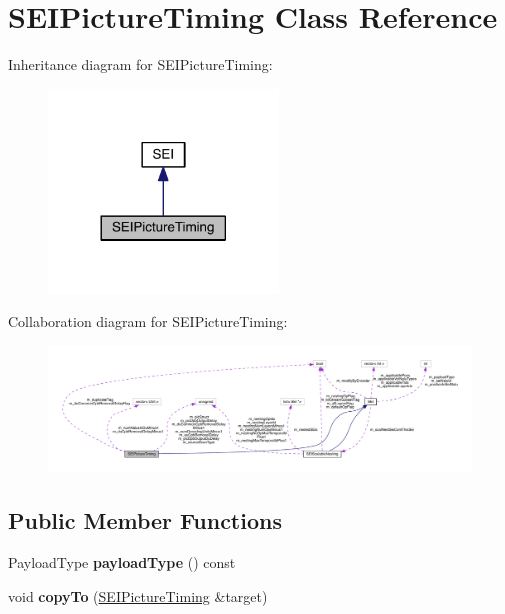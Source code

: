 \hypertarget{class_s_e_i_picture_timing}{}\section{S\+E\+I\+Picture\+Timing Class Reference}
\label{class_s_e_i_picture_timing}


Inheritance diagram for S\+E\+I\+Picture\+Timing\+:
\nopagebreak
\begin{figure}[H]
\begin{center}
\leavevmode
\includegraphics[width=173pt]{d4/d28/class_s_e_i_picture_timing__inherit__graph}
\end{center}
\end{figure}


Collaboration diagram for S\+E\+I\+Picture\+Timing\+:
\nopagebreak
\begin{figure}[H]
\begin{center}
\leavevmode
\includegraphics[width=350pt]{dd/dcf/class_s_e_i_picture_timing__coll__graph}
\end{center}
\end{figure}
\subsection*{Public Member Functions}
\begin{DoxyCompactItemize}
\item 
\mbox{\label{class_s_e_i_picture_timing_a56a94860eb04186008112f16f10b51e2}} 
Payload\+Type {\bfseries payload\+Type} () const
\item 
\mbox{\label{class_s_e_i_picture_timing_a7faac0b07237e3c8ff5a2c25a1c8d4cb}} 
void {\bfseries copy\+To} (\hyperlink{class_s_e_i_picture_timing}{S\+E\+I\+Picture\+Timing} \&target)
\end{DoxyCompactItemize}
